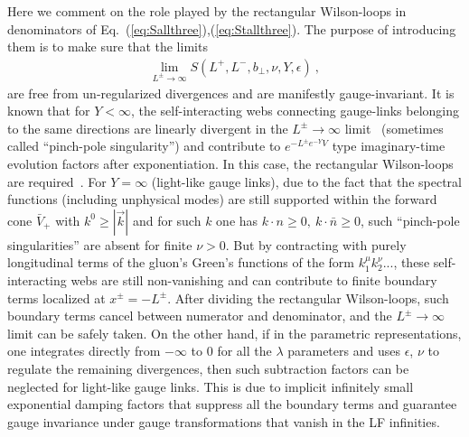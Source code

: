 \documentclass[a4paper,11pt]{article}
\begin{document}
Here we comment on the role played by the rectangular Wilson-loops in denominators of Eq.~(\ref{eq:Sallthree}),(\ref{eq:Stallthree}). The purpose of introducing them is
to make sure that the limits
\begin{align}\label{eq:Llimit}
\lim_{L^{\pm} \rightarrow \infty}S(L^+,L^-,b_\perp,\nu,Y,\epsilon) \ ,
\end{align}
are free from un-regularized divergences and are manifestly gauge-invariant. It is known that for $Y<\infty$, the self-interacting webs connecting gauge-links belonging to the same directions are linearly divergent in the $L^{\pm} \rightarrow \infty$ limit~\cite{Collins:2008ht} (sometimes called ``pinch-pole singularity'') and contribute to $e^{-L^\pm e^{-Y}V}$ type imaginary-time evolution factors after exponentiation. In this case, the rectangular Wilson-loops are required~\cite{Collins:2008ht, Ji:2018hvs,Ji:2019ewn, Ji:2019sxk}. For $Y=\infty$ (light-like gauge links), due to the fact that the spectral functions (including unphysical modes) are still supported within the forward cone $\bar V_+$ with $k^0 \ge |\vec{k}|$ and for such $k$ one has $k\cdot n \ge 0 , \  k \cdot \bar n \ge 0$, such ``pinch-pole singularities'' are absent for finite $\nu>0$. But by contracting with purely longitudinal terms of the gluon's Green's functions of the form $k_1^{\mu}k_2^{\nu}...$, these self-interacting webs are still non-vanishing and can contribute to finite boundary terms localized at $x^{\pm}=-L^{\pm}$. After dividing the rectangular Wilson-loops, such boundary terms cancel between numerator and denominator, and the $L^{\pm} \rightarrow \infty$ limit can be safely taken. On the other hand, if in the parametric representations, one integrates directly from $-\infty$ to $0$ for all the $\lambda$ parameters and uses $\epsilon$, $\nu$ to regulate the
remaining divergences, then such subtraction factors can be neglected for light-like gauge links. This is due to implicit infinitely small exponential damping factors that suppress all the boundary terms and guarantee gauge invariance under gauge transformations that vanish in the LF infinities. 
\end{document}

